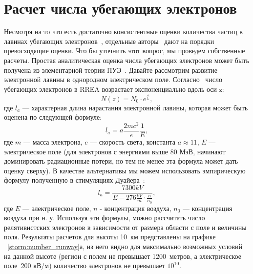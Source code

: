 \section{Расчет числа убегающих электронов}\label{sec:thunderstorm/rrea}





Несмотря на то что есть достаточно консистентные оценки количества частиц в лавинах убегающих электронов~\cite{moss2006, DwyerSmith2005, skeltved2014, Gurevich2001ufn, Dwyer2012}, отдельные авторы~\cite{Oreshkin_2018} дают на порядки превосходящие оценки. Что бы уточнить этот вопрос, мы проведем собственные расчеты. Простая аналитическая оценка числа убегающих электронов может быть получена из элементарной теории ПУЭ~\cite{Gurevich2001ufn}. Давайте рассмотрим развитие электронной лавины в однородном электрическом поле. Согласно~\cite{Gurevich2001ufn} число убегающих электронов в RREA возрастает экспоненциально вдоль оси z:
\begin{equation}
\label{storm:exp}
N(z) = N_0 \cdot e^{\frac{z}{l_a}},
\end{equation}
где $l_a$ --- характерная длина нарастания электронной лавины, которая может быть оценена по следующей формуле:
\begin{equation}
l_a = a\frac{2 m c^{2}}{e} \frac{1}{E},
\end{equation}
где $m$ --- масса электрона, $c$ --- скорость света, константа $a \approx 11$, $E$ --- электрическое поле (для электронов с энергиями выше 80 МэВ, начинают доминировать радиационные потери, но тем не менее эта формула может дать оценку сверху). В качестве альтернативы мы можем использовать эмпирическую формулу полученную в стимуляциях Дуайера~\cite{Dwyer2007}:
\begin{equation}
\label{storm:dwyer}
l_a = \frac{7300 kV}{E - 276 \frac{kV}{m} \cdot \frac{n}{n_0}},
\end{equation}
где $E$ --- электрическое поле, $n$ - концентрация воздуха, $n_0$ --- концентрация воздуха при н. у. Используя эти формулы, можно рассчитать число релятивистских электронов в зависимости от размера области с поле и величины поля. Результаты расчетов для высоты 10~км представлены на графике ~\ref{storm:number_runway}а, из него видно для максимально возможных условий на данной высоте (регион с полем не превышает 1200~метров, а электрическое поле~200 кВ/м) количество электронов не превышает $10^{10}$.

